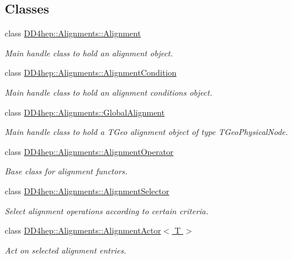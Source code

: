 \subsection*{Classes}
\begin{DoxyCompactItemize}
\item 
class \hyperlink{class_d_d4hep_1_1_alignments_1_1_alignment}{D\+D4hep\+::\+Alignments\+::\+Alignment}
\begin{DoxyCompactList}\small\item\em Main handle class to hold an alignment object. \end{DoxyCompactList}\item 
class \hyperlink{class_d_d4hep_1_1_alignments_1_1_alignment_condition}{D\+D4hep\+::\+Alignments\+::\+Alignment\+Condition}
\begin{DoxyCompactList}\small\item\em Main handle class to hold an alignment conditions object. \end{DoxyCompactList}\item 
class \hyperlink{class_d_d4hep_1_1_alignments_1_1_global_alignment}{D\+D4hep\+::\+Alignments\+::\+Global\+Alignment}
\begin{DoxyCompactList}\small\item\em Main handle class to hold a T\+Geo alignment object of type T\+Geo\+Physical\+Node. \end{DoxyCompactList}\item 
class \hyperlink{class_d_d4hep_1_1_alignments_1_1_alignment_operator}{D\+D4hep\+::\+Alignments\+::\+Alignment\+Operator}
\begin{DoxyCompactList}\small\item\em Base class for alignment functors. \end{DoxyCompactList}\item 
class \hyperlink{class_d_d4hep_1_1_alignments_1_1_alignment_selector}{D\+D4hep\+::\+Alignments\+::\+Alignment\+Selector}
\begin{DoxyCompactList}\small\item\em Select alignment operations according to certain criteria. \end{DoxyCompactList}\item 
class \hyperlink{class_d_d4hep_1_1_alignments_1_1_alignment_actor}{D\+D4hep\+::\+Alignments\+::\+Alignment\+Actor$<$ T $>$}
\begin{DoxyCompactList}\small\item\em Act on selected alignment entries. \end{DoxyCompactList}\item 

\end{DoxyCompactItemize}
